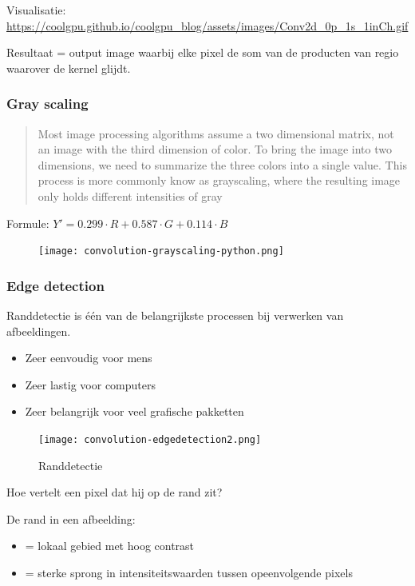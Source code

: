 \documentclass{article}
\begin{document}
Visualisatie: \url{https://coolgpu.github.io/coolgpu_blog/assets/images/Conv2d_0p_1s_1inCh.gif}

Resultaat = output image waarbij elke pixel de som van de producten van regio waarover de kernel glijdt.

\subsubsection{Gray scaling}

\begin{quote}
    Most image processing algorithms assume a two dimensional matrix,
not an image with the third dimension of color. To bring the image into
two dimensions, we need to summarize the three colors into a single
value. This process is more commonly know as grayscaling, where the
resulting image only holds different intensities of gray
\end{quote}

Formule: $Y' = 0.299\cdot R + 0.587\cdot G + 0.114\cdot B$

\begin{figure}[H]
    \centering
    \texttt{[image: convolution-grayscaling-python.png]}
\end{figure}

\subsubsection{Edge detection}

Randdetectie is één van de belangrijkste processen bij verwerken van afbeeldingen.

\begin{itemize}
    \item Zeer eenvoudig voor mens
    \item Zeer lastig voor computers
    \item Zeer belangrijk voor veel grafische pakketten
\end{itemize}

\begin{figure}[H]
    \centering
    \texttt{[image: convolution-edgedetection2.png]}
    \caption{Randdetectie}
\end{figure}


Hoe vertelt een pixel dat hij op de rand zit?

De rand in een afbeelding:

\begin{itemize}
    \item = lokaal gebied met hoog contrast
    \item = sterke sprong in intensiteitswaarden tussen opeenvolgende pixels
\end{itemize}
\end{document}
